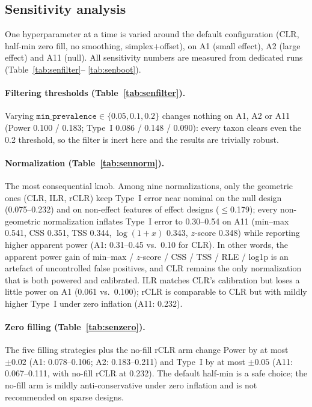 \documentclass[11pt]{article}
\begin{document}
\subsection{Sensitivity analysis} \label{sec:sens}

One hyperparameter at a time is varied around the default configuration (CLR, half-min zero fill,
no smoothing, simplex$+$offset), on A1 (small effect), A2 (large effect) and A11 (null). All
sensitivity numbers are measured from dedicated runs (Table~\ref{tab:senfilter}--
\ref{tab:senboot}).

\paragraph{Filtering thresholds (Table~\ref{tab:senfilter}).}
Varying $\texttt{min\_prevalence}\in\{0.05,0.1,0.2\}$ changes nothing on A1, A2 or A11 (Power
0.100 / 0.183; Type~I 0.086 / 0.148 / 0.090): every taxon clears even the 0.2 threshold, so the
filter is inert here and the results are trivially robust.

\paragraph{Normalization (Table~\ref{tab:sennorm}).}
The most consequential knob. Among nine normalizations, only the geometric ones (CLR, ILR, rCLR)
keep Type~I error near nominal on the null design (0.075--0.232) and on non-effect features of
effect designs ($\le$0.179); every non-geometric normalization inflates Type~I error to
0.30--0.54 on A11 (min--max 0.541, CSS 0.351, TSS 0.344, $\log(1{+}x)$ 0.343, $z$-score 0.348)
while reporting higher apparent power (A1: 0.31--0.45 vs.\ 0.10 for CLR). In other words, the
apparent power gain of min--max / $z$-score / CSS / TSS / RLE / log1p is an artefact of
uncontrolled false positives, and CLR remains the only normalization that is both powered and
calibrated. ILR matches CLR's calibration but loses a little power on A1 (0.061 vs.\ 0.100); rCLR
is comparable to CLR but with mildly higher Type~I under zero inflation (A11: 0.232).

\paragraph{Zero filling (Table~\ref{tab:senzero}).}
The five filling strategies plus the no-fill rCLR arm change Power by at most $\pm 0.02$ (A1:
0.078--0.106; A2: 0.183--0.211) and Type~I by at most $\pm 0.05$ (A11: 0.067--0.111, with
no-fill rCLR at 0.232). The default half-min is a safe choice; the no-fill arm is mildly
anti-conservative under zero inflation and is not recommended on sparse designs.
\end{document}
